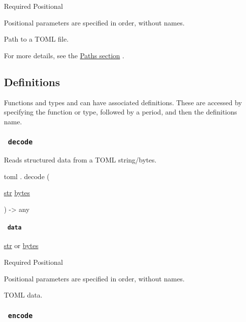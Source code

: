 {Required} {{ Positional }}

\label{parameters-path-positional-tooltip}
Positional parameters are specified in order, without names.

Path to a TOML file.

For more details, see the \href{/docs/reference/syntax/\#paths}{Paths
section} .

\subsection{\texorpdfstring{{ Definitions
}}{ Definitions }}\label{definitions}

\label{definitions-tooltip}
Functions and types and can have associated definitions. These are
accessed by specifying the function or type, followed by a period, and
then the definition\textquotesingle s name.

\subsubsection{\texorpdfstring{\texttt{\ decode\ }}{ decode }}\label{definitions-decode}

Reads structured data from a TOML string/bytes.

toml { . } { decode } (

{ \href{/docs/reference/foundations/str/}{str}
\href{/docs/reference/foundations/bytes/}{bytes} }

) -\textgreater{} { any }

\paragraph{\texorpdfstring{\texttt{\ data\ }}{ data }}\label{definitions-decode-data}

\href{/docs/reference/foundations/str/}{str} {or}
\href{/docs/reference/foundations/bytes/}{bytes}

{Required} {{ Positional }}

\label{definitions-decode-data-positional-tooltip}
Positional parameters are specified in order, without names.

TOML data.

\subsubsection{\texorpdfstring{\texttt{\ encode\ }}{ encode }}\label{definitions-encode}

